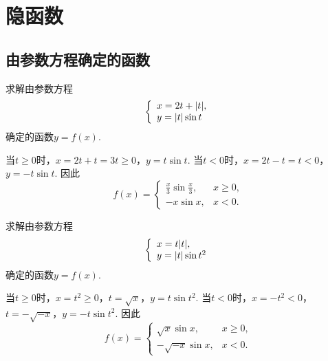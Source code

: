 \section{隐函数}
\subsection{由参数方程确定的函数}
\begin{example}
求解由参数方程\begin{equation*}
	\left\{ \begin{array}{l}
		x = 2t + \abs{t}, \\
		y = \abs{t} \sin t
	\end{array} \right.
\end{equation*}确定的函数\(y = f(x)\).
\begin{solution}
当\(t\geq0\)时，\(x = 2t + t = 3t \geq 0\)，\(y = t \sin t\).
当\(t<0\)时，\(x = 2t - t = t < 0\)，\(y = -t \sin t\).
因此\begin{equation*}
	f(x) = \left\{ \begin{array}{cl}
		\frac{x}{3} \sin \frac{x}{3}, & x\geq0, \\
		-x \sin x, & x<0.
	\end{array} \right.
\end{equation*}
\end{solution}
\end{example}
\begin{example}
求解由参数方程\begin{equation*}
	\left\{ \begin{array}{l}
		x = t \abs{t}, \\
		y = \abs{t} \sin t^2
	\end{array} \right.
\end{equation*}确定的函数\(y = f(x)\).
\begin{solution}
当\(t\geq0\)时，\(x = t^2 \geq 0\)，\(t = \sqrt{x}\)，\(y = t \sin t^2\).
当\(t<0\)时，\(x = -t^2 < 0\)，\(t = -\sqrt{-x}\)，\(y = -t \sin t^2\).
因此\begin{equation*}
	f(x) = \left\{ \begin{array}{cl}
		\sqrt{x} \sin x, & x\geq0, \\
		-\sqrt{-x} \sin x, & x<0.
	\end{array} \right.
\end{equation*}
\end{solution}
\end{example}
